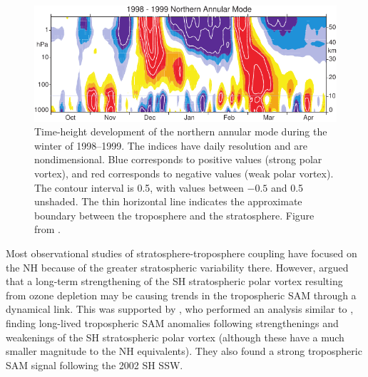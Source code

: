 \begin{figure}
 \centering
 \noindent\includegraphics[width=\textwidth]{figures/chapter-intro/Baldwin_Dunkerton_98-99.pdf}
 \caption[NAM time series from \citet{Baldwin2001a}]{Time-height development of
   the northern annular mode during the winter of 1998--1999. The indices have
   daily resolution and are nondimensional. Blue corresponds to positive values
   (strong polar vortex), and red corresponds to negative values (weak polar
   vortex). The contour interval is 0.5, with values between $-0.5$ and 0.5
   unshaded. The thin horizontal line indicates the approximate boundary between
   the troposphere and the stratosphere. Figure from \citet{Baldwin2001a}.}
 \label{fig:baldwin_dunkerton}
\end{figure}

Most observational studies of stratosphere-troposphere coupling have focused on
the NH because of the greater stratospheric variability there. However,
\citet{Thompson2002a} argued that a long-term strengthening of the SH
stratospheric polar vortex resulting from ozone depletion may be causing trends
in the tropospheric SAM through a dynamical link. This was supported by
\citet{Thompson2005}, who performed an analysis similar to \citet{Baldwin2001a},
finding long-lived tropospheric SAM anomalies following strengthenings and
weakenings of the SH stratospheric polar vortex (although these have a much
smaller magnitude to the NH equivalents). They also found a strong tropospheric
SAM signal following the 2002 SH SSW.

